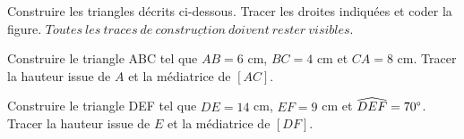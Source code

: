 \documentclass[a4paper,11pt]{exam}
\begin{document}
\vspace*{-0.3cm}


Construire les triangles décrits ci-dessous. Tracer les droites indiquées et coder la figure. $\underline{Toutes\  les\  traces\  de\  construction\  doivent\  rester\  visibles.}$


\begin{questions}

	\question[6] Construire le triangle ABC tel que $AB = 6$ cm, $BC = 4$ cm et $CA = 8$ cm. Tracer la hauteur issue de $A$ et la médiatrice de $[AC]$.
	
	\newpage
	
	\question[6] Construire le triangle DEF tel que $DE = 14$ cm, $EF = 9$ cm et $\widehat{DEF} = 70 \degree$. Tracer la hauteur issue de $E$ et la médiatrice de $[DF]$.

\end{questions}


\label{LastPage}
\end{document}
